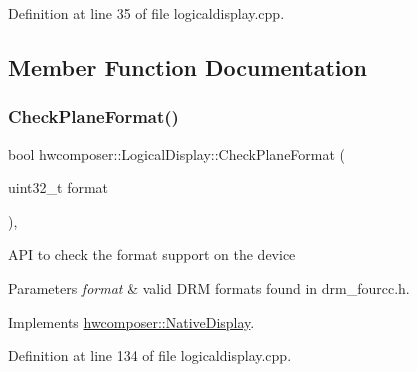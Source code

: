 Definition at line 35 of file logicaldisplay.\+cpp.


\begin{DoxyCode}{0}
\end{DoxyCode}


\subsection{Member Function Documentation}
\mbox{\label{classhwcomposer_1_1LogicalDisplay_ae54b9d9a1d980ed587f43aef1c2a6f2c}} 
\subsubsection{\texorpdfstring{Check\+Plane\+Format()}{CheckPlaneFormat()}}
{\footnotesize\ttfamily bool hwcomposer\+::\+Logical\+Display\+::\+Check\+Plane\+Format (\begin{DoxyParamCaption}\item[{uint32\+\_\+t}]{format }\end{DoxyParamCaption})\hspace{0.3cm}{\ttfamily [override]}, {\ttfamily [virtual]}}

A\+PI to check the format support on the device 
\begin{DoxyParams}{Parameters}
{\em format} & valid D\+RM formats found in drm\+\_\+fourcc.\+h. \\
\hline
\end{DoxyParams}


Implements \mbox{\hyperlink{classhwcomposer_1_1NativeDisplay_a4e856b5754054bdf77467e6663cb5b50}{hwcomposer\+::\+Native\+Display}}.



Definition at line 134 of file logicaldisplay.\+cpp.


\begin{DoxyCode}{0}
\end{DoxyCode}
\mbox{\label{classhwcomposer_1_1LogicalDisplay_a14d300f193051c5cd3e259bb0534401b}} 
